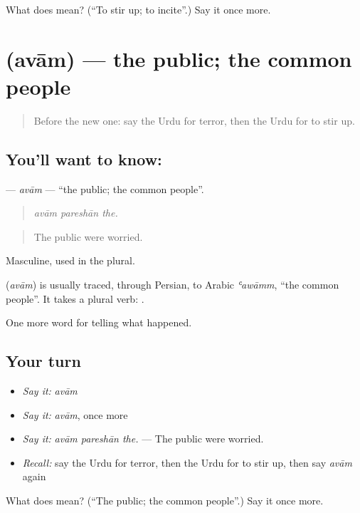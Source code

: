 \begin{tcolorbox}[breakable,colback=teal!4,colframe=teal!35!black,title={Before you move on}]
What does  mean? (\textquotedblleft{}To stir up; to incite\textquotedblright{}.) Say it once more.
\end{tcolorbox}
\section[\texorpdfstring{\ur{عوام} (avām)}{عوام (avām)}]{ (avām) — the public; the common people}

\label{lesson:UR-C302-avam}



\begin{quote}
Before the new one: say the Urdu for terror, then the Urdu for to stir up.
\end{quote}

\subsection*{You'll want to know: }
\textbf{} — \emph{avām} — \textquotedblleft{}the public; the common people\textquotedblright{}.

\begin{quote}
  
\end{quote}

\begin{quote}
\emph{avām pareshān the.}
\end{quote}

\begin{quote}
The public were worried.
\end{quote}

Masculine, used in the plural.

\begin{cousinweb}
\textbf{} (\emph{avām}) is usually traced, through Persian, to Arabic \emph{ʿawāmm}, \textquotedblleft{}the common people\textquotedblright{}. It takes a plural verb: \textbf{  }.
\end{cousinweb}

\begin{grammarlens}[title={What you've built}]
One more word for telling what happened.
\end{grammarlens}

\subsection*{Your turn}
\begin{itemize}
\raggedright
  \item \emph{Say it:} \emph{avām}
  \item \emph{Say it:} \emph{avām}, once more
  \item \emph{Say it:} \emph{avām pareshān the.} — The public were worried.
  \item \emph{Recall:} say the Urdu for terror, then the Urdu for to stir up, then say \emph{avām} again
\end{itemize}

\begin{tcolorbox}[breakable,colback=teal!4,colframe=teal!35!black,title={Before you move on}]
What does  mean? (\textquotedblleft{}The public; the common people\textquotedblright{}.) Say it once more.
\end{tcolorbox}
